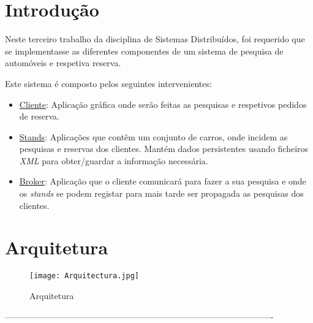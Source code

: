 \documentclass[a4paper]{article}
\begin{document}
\newpage
\thispagestyle{empty} %

\tableofcontents

\newpage
\setcounter{page}{1} %

\section{Introdução}

Neste terceiro trabalho da disciplina de Sistemas Distribuídos, foi requerido que se implementasse as diferentes componentes de um sistema de pesquisa de automóveis e respetiva reserva.

Este sistema é composto pelos seguintes intervenientes:

\begin{itemize}

\item
\underline{Cliente}: Aplicação gráfica onde serão feitas as pesquisas e respetivos pedidos de reserva.

\item
\underline{Stands}: Aplicações que contêm um conjunto de carros, onde incidem as pesquisas e reservas dos clientes. Mantém dados persistentes usando ficheiros \emph{XML} para obter/guardar a informação necessária. 

\item
\underline{Broker}: Aplicação que o cliente comunicará para fazer a sua pesquisa e onde os \emph{stands} se podem registar para mais tarde ser propagada as pesquisas dos clientes.

\end{itemize}

\newpage

\section{Arquitetura}

\begin{figure}[H]
\centering
\texttt{[image: Arquitectura.jpg]}
\caption{Arquitetura}
  \label{fig:httpHeaderReq}
\end{figure}

----------------------------------------------------------------------------------------------
\end{document}

